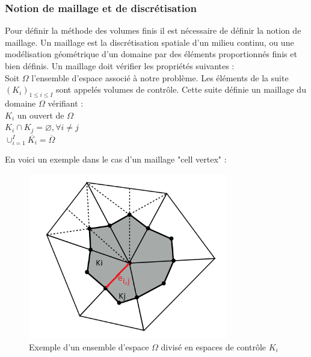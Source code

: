 \documentclass[12pt]{article}
\begin{document}
\subsubsection{Notion de maillage et de discrétisation}

\noindent Pour définir la méthode des volumes finis il est nécessaire de définir la notion de maillage.
Un maillage est la discrétisation spatiale d'un milieu continu, ou une modélisation géométrique d'un domaine par des éléments proportionnés finis et bien définis. Un maillage doit vérifier les propriétés suivantes :
\\Soit $\Omega$ l'ensemble d'espace associé à notre problème. 
Les éléments de la suite $(K_i)_{1\leq{i}\leq{I}}$ sont appelés volumes de contrôle. Cette suite définie un maillage du domaine $\Omega$  vérifiant :
\\  $K_i$ un ouvert de $\Omega$
\\  $K_i \cap K_j = \varnothing, \forall i \neq j$
\\  $\cup_{i=1}^{I} \overline{K_i} = \overline{\Omega}$

\noindent En voici un exemple dans le cas d'un maillage "cell vertex" :

    \begin{figure}[H]
	\centering
	\includegraphics[scale=0.5]{Ki.png}
	\caption{Exemple d'un ensemble d'espace $\Omega$ divisé en espaces de contrôle $K_i$}
	\label{Ki}
	\end{figure}
\newpage
\end{document}
